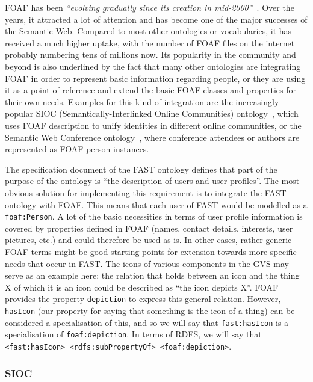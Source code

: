\documentclass[twoside]{fast_latex}
\begin{document}
FOAF has been \emph{``evolving gradually since its creation in mid-2000''}~\cite{brickley2004foaf}. Over the years, it attracted a lot of attention and has become one of the major successes of the Semantic Web. Compared to most other ontologies or vocabularies, it has received a much higher uptake, with the number of FOAF files on the internet probably numbering tens of millions now. Its popularity in the community and beyond is also underlined by the fact that many other ontologies are integrating FOAF in order to represent basic information regarding people, or they are using it as a point of reference and extend the basic FOAF classes and properties for their own needs. Examples for this kind of integration are the increasingly popular SIOC (Semantically-Interlinked Online Communities) ontology~\cite{breslin2005communitiesEswc}, which uses FOAF description to unify identities in different online communities, or the Semantic Web Conference ontology~\cite{moeller2007dogfood}, where conference attendees or authors are represented as FOAF person instances.

The specification document of the FAST ontology defines that part of the purpose of the ontology is ``the description of users and user profiles''. The most obvious solution for implementing this requirement is to integrate the FAST ontology with FOAF. This means that each user of FAST would be modelled as a \texttt{foaf:Person}. A lot of the basic necessities in terms of user profile information is covered by properties defined in FOAF (names, contact details, interests, user pictures, etc.) and could therefore be used as is. In other cases, rather generic FOAF terms might be good starting points for extension towards more specific needs that occur in FAST. The icons of various components in the GVS may serve as an example here: the relation that holds between an icon and the thing X of which it is an icon could be described as ``the icon depicts X''. FOAF provides the property \texttt{depiction} to express this general relation. However, \texttt{hasIcon} (our property for saying that something is the icon of a thing) can be considered a specialisation of this, and so we will say that \texttt{fast:hasIcon} is a specialisation of \texttt{foaf:depiction}. In terms of RDFS, we will say that \texttt{<fast:hasIcon> <rdfs:subPropertyOf> <foaf:depiction>}.

\subsubsection{SIOC} %
\label{ssub:sioc}
\end{document}

